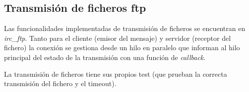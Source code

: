 \subsection{Transmisión de ficheros ftp}

Las funcionalidades implementadas de transmisión de ficheros se encuentran en \textit{irc\_ftp}. Tanto para el cliente (emisor del mensaje) y servidor (receptor del fichero) la conexión se gestiona desde un hilo en paralelo que informan al hilo principal del estado de la transmisión con una función de \textit{callback}. 

La transmisión de ficheros tiene sus propios test (que prueban la correcta transmisión del fichero y el timeout).
